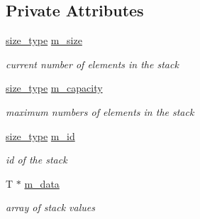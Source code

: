\subsection*{Private Attributes}
\begin{DoxyCompactItemize}
\item 
\mbox{\label{class_my_namespace_1_1_stack_a8dc67ce3b507b90e42be856e8833dbda}} 
\hyperlink{class_my_namespace_1_1_stack_a19c43f92e11d91ed645058833af88a86}{size\+\_\+type} \hyperlink{class_my_namespace_1_1_stack_a8dc67ce3b507b90e42be856e8833dbda}{m\+\_\+size}
\begin{DoxyCompactList}\small\item\em current number of elements in the stack \end{DoxyCompactList}\item 
\mbox{\label{class_my_namespace_1_1_stack_a7ae852a00a97fdfc29d45b18d8066f77}} 
\hyperlink{class_my_namespace_1_1_stack_a19c43f92e11d91ed645058833af88a86}{size\+\_\+type} \hyperlink{class_my_namespace_1_1_stack_a7ae852a00a97fdfc29d45b18d8066f77}{m\+\_\+capacity}
\begin{DoxyCompactList}\small\item\em maximum numbers of elements in the stack \end{DoxyCompactList}\item 
\mbox{\label{class_my_namespace_1_1_stack_a0805ceeb13ebf75b9414f174f7cbaaa5}} 
\hyperlink{class_my_namespace_1_1_stack_a19c43f92e11d91ed645058833af88a86}{size\+\_\+type} \hyperlink{class_my_namespace_1_1_stack_a0805ceeb13ebf75b9414f174f7cbaaa5}{m\+\_\+id}
\begin{DoxyCompactList}\small\item\em id of the stack \end{DoxyCompactList}\item 
\mbox{\label{class_my_namespace_1_1_stack_a879d4f11844cd89af078bee705be9daf}} 
T $\ast$ \hyperlink{class_my_namespace_1_1_stack_a879d4f11844cd89af078bee705be9daf}{m\+\_\+data}
\begin{DoxyCompactList}\small\item\em array of stack values \end{DoxyCompactList}\end{DoxyCompactItemize}
